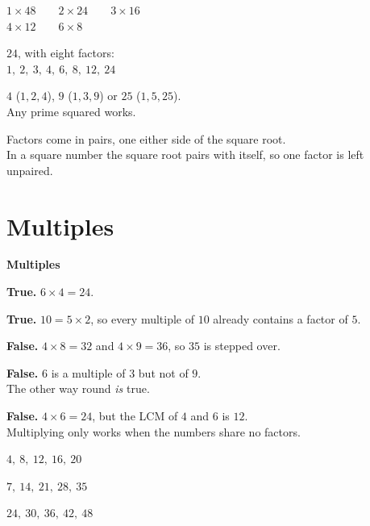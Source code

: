 \documentclass[aspectratio=169]{beamer}
\newcommand{\qtopic}[1]{%
  \section{#1}%
  \begin{frame}
    \vfill
    \begin{center}
      {\usebeamercolor[fg]{structure}\Huge\bfseries #1}
    \end{center}
    \vfill
  \end{frame}%
}
\begin{document}
  {$1\times 48\qquad 2\times 24\qquad 3\times 16$\\[0.4em]
   $4\times 12\qquad 6\times 8$}

  {$24$, with eight factors:\\[0.3em]
   $1,\ 2,\ 3,\ 4,\ 6,\ 8,\ 12,\ 24$}

  {$4$ ($1,2,4$), $9$ ($1,3,9$) or $25$ ($1,5,25$).\\[0.3em]
   Any prime squared works.}

  {Factors come in pairs, one either side of the square root.\\[0.3em]
   In a square number the square root pairs with itself,
   so one factor is left unpaired.}

\qtopic{Multiples}

  {\textbf{True.} $6\times 4=24$.}

  {\textbf{True.} $10=5\times 2$, so every multiple of $10$
   already contains a factor of $5$.}

  {\textbf{False.} $4\times 8=32$ and $4\times 9=36$, so $35$ is stepped over.}

  {\textbf{False.} $6$ is a multiple of $3$ but not of $9$.\\[0.3em]
   The other way round \emph{is} true.}

  {\textbf{False.} $4\times 6=24$, but the LCM of $4$ and $6$ is $12$.\\[0.3em]
   Multiplying only works when the numbers share no factors.}

  {$4,\ 8,\ 12,\ 16,\ 20$}

  {$7,\ 14,\ 21,\ 28,\ 35$}

  {$24,\ 30,\ 36,\ 42,\ 48$}
\end{document}
